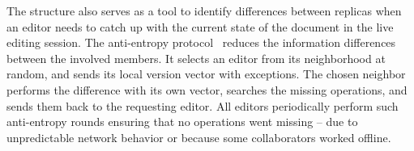 
The structure also serves as a tool to identify differences between replicas
when an editor needs to catch up with the current state of the document in the
live editing session. The anti-entropy protocol~\cite{demers1987epidemic}
reduces the information differences between the involved members. It selects an
editor from its neighborhood at random, and sends its local version vector with
exceptions. The chosen neighbor performs the difference with its own vector,
searches the missing operations, and sends them back to the requesting
editor. All editors periodically perform such anti-entropy rounds ensuring that
no operations went missing -- due to unpredictable network behavior or because
some collaborators worked offline.





